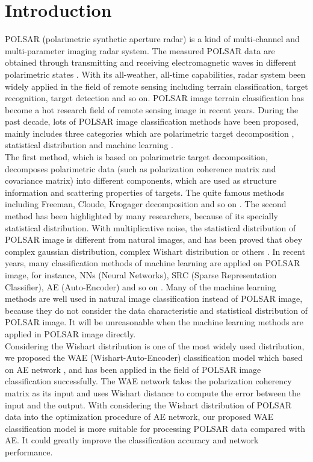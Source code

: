 \documentclass[11pt, a4paper, onecolumn, oneside]{article}
\begin{document}
\section{Introduction}

POLSAR (polarimetric synthetic aperture radar) is a kind of multi-channel and multi-parameter imaging radar system. The measured POLSAR data are obtained through transmitting and receiving electromagnetic waves in different polarimetric states \cite{a, b}. With its all-weather, all-time capabilities, radar system been widely applied in the field of remote sensing including terrain classification, target recognition, target detection \cite{c, d, e, f} and so on. POLSAR image terrain classification has become a hot research field of remote sensing image in recent years. During the past decade, lots of POLSAR image classification methods have been proposed, mainly includes three categories which are polarimetric target decomposition \cite{g, h, i}, statistical distribution \cite{j, k} and machine learning \cite{m, n}.\\

The first method, which is based on polarimetric target decomposition, decomposes polarimetric data (such as polarization coherence matrix and covariance matrix) into different components, which are used as structure information and scattering properties of targets. The quite famous methods including Freeman, Cloude, Krogager decomposition and so on \cite{g, h, o}. The second method has been highlighted by many researchers, because of its specially statistical distribution. With multiplicative noise, the statistical distribution of POLSAR image is different from natural images, and has been proved that obey complex gaussian distribution, complex Wishart distribution or others \cite{j, k}. In recent years, many classification methods of machine learning are applied on POLSAR image, for instance, NNs (Neural Networks), SRC (Sparse Representation Classifier), AE (Auto-Encoder) and so on \cite{p, q, r, s}. Many of the machine learning methods are well used in natural image classification instead of POLSAR image, because they do not consider the data characteristic and statistical distribution of POLSAR image. It will be unreasonable when the machine learning methods are applied in POLSAR image directly.\\

Considering the Wishart distribution is one of the most widely used distribution, we proposed the WAE (Wishart-Auto-Encoder) classification model \cite{c} which based on AE network \cite{t}, and has been applied in the field of POLSAR image classification successfully. The WAE network takes the polarization coherency matrix as its input and uses Wishart distance to compute the error between the input and the output. With considering the Wishart distribution of POLSAR data into the optimization procedure of AE network, our proposed WAE classification model is more suitable for processing POLSAR data compared with AE. It could greatly improve the classification accuracy and network performance.\\
\end{document}

